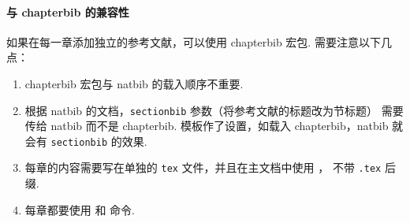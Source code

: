 \documentclass[a4paper]{ltxdoc}
\DeclareRobustCommand\file{\nolinkurl}
\DeclareRobustCommand\pkg{\textsf}
\DeclareRobustCommand\opt{\texttt}
\begin{document}
\paragraph{与 \pkg{chapterbib} 的兼容性}
如果在每一章添加独立的参考文献，可以使用 \pkg{chapterbib} 宏包.
需要注意以下几点：
\begin{enumerate}
  \item \pkg{chapterbib} 宏包与 \pkg{natbib} 的载入顺序不重要.
  \item 根据 \pkg{natbib} 的文档，\opt{sectionbib} 参数（将参考文献的标题改为节标题）
    需要传给 \pkg{natbib} 而不是 \pkg{chapterbib}.
    模板作了设置，如载入 \pkg{chapterbib}，\pkg{natbib} 就会有 \opt{sectionbib} 的效果.
  \item 每章的内容需要写在单独的 \file{tex} 文件，并且在主文档中使用 ，
    不带 \file{.tex} 后缀.
  \item 每章都要使用  和  命令.
\end{enumerate}
\end{document}

